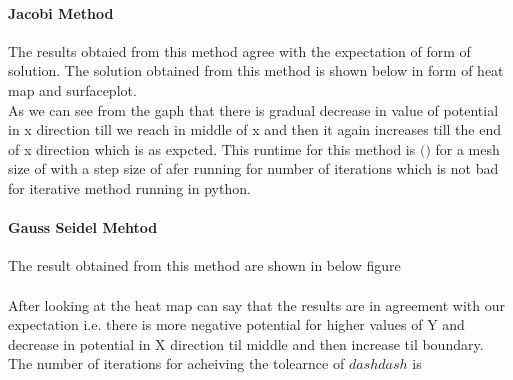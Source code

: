 \paragraph{Jacobi Method}
The results obtaied from this method agree with the expectation of form of solution. The solution obtained from this method is shown below in form of heat map and surfaceplot. \\

As we can see from the gaph that there is gradual decrease in value of potential in x direction till we reach in middle of x and then it again increases till the end of x direction which is as expcted.
This runtime for this method is  $\Bigg() $ for a mesh size of with a step size of afer running for    number of iterations which is not bad for iterative method running in python.\\

\paragraph{Gauss Seidel Mehtod} The result obtained from this method are shown in below figure \\
\\
After looking at the heat map can say that the results are in agreement with our expectation i.e. there is more negative potential for higher values of Y and decrease in potential in X direction til middle and then increase til boundary. The number of iterations for acheiving the tolearnce of $ dash dash $ is $  $ 



